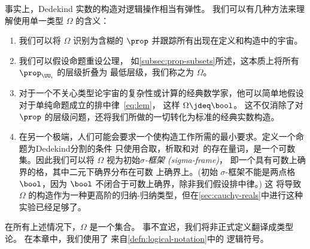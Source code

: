 事实上，Dedekind 实数的构造对逻辑操作相当有弹性。
我们可以有几种方法来理解使用单一类型
$\Omega$ 的含义：
%
\begin{enumerate}

  \item 我们可以将 $\Omega$ 识别为含糊的 $\prop$ 并跟踪所有出现在定义和构造中的宇宙。

  \item 我们可以假设命题重设公理，
  如\cref{subsec:prop-subsets}所述，这本质上将所有 $\prop_{\UU_i}$ 的层级折叠为
  最低层级，我们称之为 $\Omega$。

  \item 对于一个不关心类型论宇宙的复杂性或计算的经典数学家，他可以简单地假设对于单纯命题成立的排中律~\eqref{eq:lem}，
  这样 $\Omega \jdeq \bool$。
  这不仅消除了对
  $\prop$ 的层级问题，还将我们所做的一切转化为标准的经典实数构造。

  \item 在另一个极端，人们可能会要求一个使构造工作所需的最小要求。定义一个命题为Dedekind分割的条件
  只使用合取，析取和对~\Q 的存在量词，\Q 是一个可数集。因此我们可以将 $\Omega$ 视为初始\emph{$\sigma$-框架 (sigma-frame)}，
  即一个具有可数上确界的格，其中二元下确界分布在可数
  上确界上。(初始 $\sigma$-框架不能是两点格 $\bool$，因为
  $\bool$ 不闭合于可数上确界，除非我们假设排中律。) 这
  将导致 $\Omega$ 的构造作为一种更高阶的归纳-归纳类型，但在\cref{sec:cauchy-reals}中进行这种实验已经足够了。
\end{enumerate}

在所有上述情况下，$\Omega$ 是一个集合。
%
事不宜迟，我们将非正式定义翻译成类型论。
在本章中，我们使用了
来自\cref{defn:logical-notation}中的
逻辑符号。

